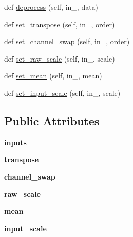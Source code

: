 \begin{DoxyCompactItemize}
\item 
def \mbox{\hyperlink{classcaffe_1_1io_1_1_transformer_a3d048b7f8d255d29c04c2bcce0db318e}{deprocess}} (self, in\+\_\+, data)
\item 
def \mbox{\hyperlink{classcaffe_1_1io_1_1_transformer_af0acba3b0fe23e7fe33228600b18279a}{set\+\_\+transpose}} (self, in\+\_\+, order)
\item 
def \mbox{\hyperlink{classcaffe_1_1io_1_1_transformer_abd32a70aebb66e66de7567800547b114}{set\+\_\+channel\+\_\+swap}} (self, in\+\_\+, order)
\item 
def \mbox{\hyperlink{classcaffe_1_1io_1_1_transformer_aa02e06527de8f0e02d3065bf83b875a9}{set\+\_\+raw\+\_\+scale}} (self, in\+\_\+, scale)
\item 
def \mbox{\hyperlink{classcaffe_1_1io_1_1_transformer_a7064401b3aa295a6ab61895563a60d16}{set\+\_\+mean}} (self, in\+\_\+, mean)
\item 
def \mbox{\hyperlink{classcaffe_1_1io_1_1_transformer_ab3d72541298e2fb73a884df37e56f65c}{set\+\_\+input\+\_\+scale}} (self, in\+\_\+, scale)
\end{DoxyCompactItemize}
\subsection*{Public Attributes}
\begin{DoxyCompactItemize}
\item 
\mbox{\label{classcaffe_1_1io_1_1_transformer_a39504b59a20b17b063c896af4e0147a6}} 
{\bfseries inputs}
\item 
\mbox{\label{classcaffe_1_1io_1_1_transformer_a0a2e0695edb3b47999ed4e9ae42771d4}} 
{\bfseries transpose}
\item 
\mbox{\label{classcaffe_1_1io_1_1_transformer_aab33f13f4d564b0baddac568ff626e25}} 
{\bfseries channel\+\_\+swap}
\item 
\mbox{\label{classcaffe_1_1io_1_1_transformer_a09f0e65ba030d5ded3dc5e3b229dd16f}} 
{\bfseries raw\+\_\+scale}
\item 
\mbox{\label{classcaffe_1_1io_1_1_transformer_a0a55c117f0577883e6d2c1251c01d16d}} 
{\bfseries mean}
\item 
\mbox{\label{classcaffe_1_1io_1_1_transformer_a85c5851acbd0956a63742059b75df1c7}} 
{\bfseries input\+\_\+scale}
\end{DoxyCompactItemize}


